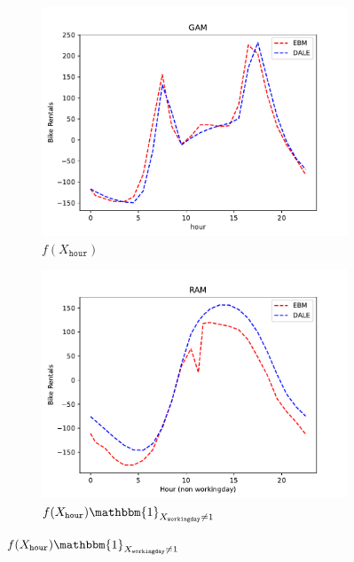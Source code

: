 \documentclass[12pt]{article}
\newcommand{\when}[1]{\mathbbm{1}_{#1}}
\begin{document}
\begin{figure}[htbp]
    \centering
    \begin{subfigure}{0.32\textwidth}
        \centering
        \includegraphics[width=\textwidth]{figures/bike_rentals_gam}
        \caption{\(f(X_{\mathtt{hour}})\)}
        \label{subfig:bike_rentals_gam}
    \end{subfigure}
    \begin{subfigure}{0.32\textwidth}
        \centering
        \includegraphics[width=\textwidth]{figures/bike_rentals_ram_1}
        \caption{\(f(X_{\mathtt{hour}}) \when{X_{\mathtt{workingday}} \neq 1}\)}
        \label{subfig:bike_rentals_regional_gam_1}
    \end{subfigure}

\end{figure}
\end{document}
